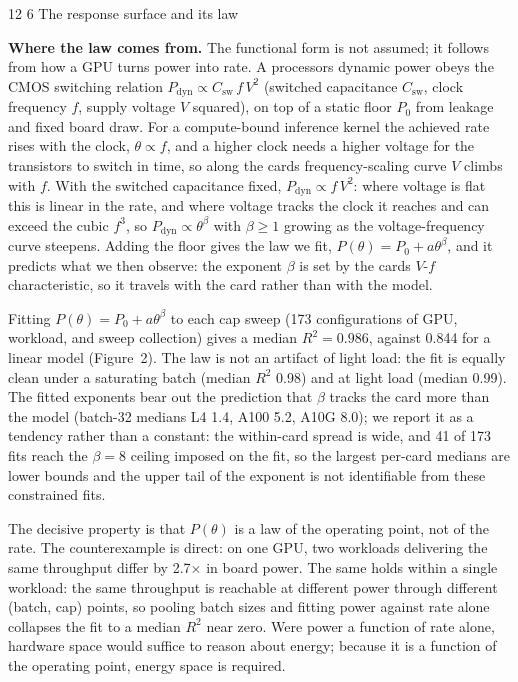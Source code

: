 \documentclass[3p,twocolumn]{elsarticle}
\makeatletter
\renewcommand\section{\@startsection{section}{1}{\z@}%
           {12\p@ \@plus 4\p@ \@minus 4\p@}%
           {6\p@ \@plus 4\p@ \@minus 3\p@}%
           {\normalsize\bfseries\boldmath}}
\makeatother
\begin{document}
\section{The response surface and its law}\label{the-response-surface-and-its-law}

\textbf{Where the law comes from.} The functional form is not assumed; it follows from how a GPU turns power
into rate. A processor\textquotesingle s dynamic power obeys the CMOS switching relation
{\(P_{\mathrm{dyn}}\propto C_{\mathrm{sw}}\,f\,V^2\)} (switched capacitance
{\(C_{\mathrm{sw}}\)}, clock frequency {\(f\)}, supply voltage {\(V\)} squared),
on top of a static floor {\(P_0\)} from leakage and fixed board draw. For a compute-bound
inference kernel the achieved rate rises with the clock, {\(\theta\propto f\)}, and a higher clock
needs a higher voltage for the transistors to switch in time, so along the card\textquotesingle s frequency-scaling curve {\(V\)} climbs
with {\(f\)}. With the switched capacitance fixed, {\(P_{\mathrm{dyn}}\propto f\,V^2\)}: where
voltage is flat this is linear in the rate, and where voltage tracks the clock it reaches and can exceed the
cubic {\(f^3\)}, so {\(P_{\mathrm{dyn}}\propto \theta^{\beta}\)} with
{\(\beta\ge 1\)} growing as the voltage-frequency curve steepens. Adding the floor gives the law
we fit, {\(P(\theta)=P_0+a\theta^{\beta}\)}, and it predicts what we then observe: the exponent
{\(\beta\)} is set by the card\textquotesingle s {\(V\)}-{\(f\)} characteristic, so it
travels with the card rather than with the model.

Fitting {\(P(\theta)=P_0+a\theta^\beta\)} to each
cap sweep (173 configurations of GPU, workload, and sweep collection) gives a median
{\(R^2=0.986\)}, against 0.844 for a linear model (Figure~2). The law is
not an artifact of light load: the fit is equally clean under a saturating batch (median
{\(R^2\)} 0.98) and at light load (median 0.99). The fitted exponents bear out the prediction that {\(\beta\)} tracks the card
more than the model
(batch-32 medians L4 1.4, A100 5.2,
A10G 8.0); we report it as a tendency rather than a constant: the within-card
spread is wide, and 41 of 173 fits reach the {\(\beta=8\)} ceiling imposed
on the fit, so the largest per-card medians are lower bounds and the upper tail of the exponent is not identifiable from these constrained fits.

The decisive property is that {\(P(\theta)\)} is a law of the operating point, not of the rate.
The counterexample is direct: on one GPU, two workloads delivering the same throughput
differ by 2.7$\times$ in board power. The same holds within a single workload: the same
throughput is reachable at different power
through different (batch, cap) points, so pooling batch sizes and fitting power against rate alone collapses
the fit to a median {\(R^2\)} near zero. Were power a function of rate alone, hardware space would suffice to
reason about energy; because it is a function of the operating point, energy space is required.
\end{document}
